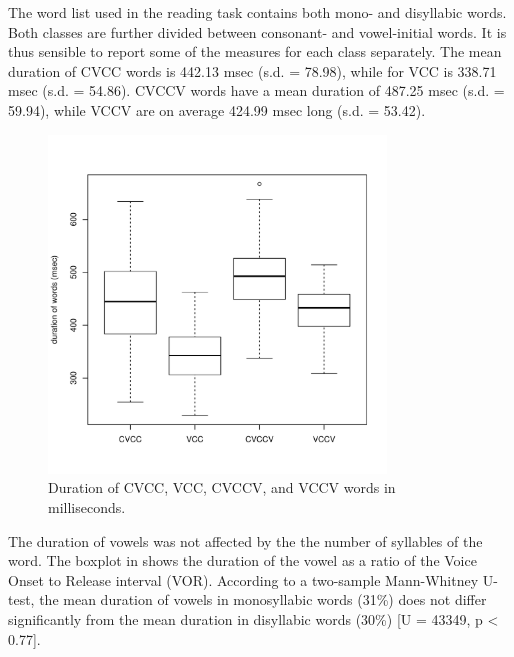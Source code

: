 \documentclass[11pt,a4paper,oneside,openany]{memoir}\usepackage[]{graphicx}\usepackage[]{color}
\newenvironment{knitrout}{}{} %
\begin{document}
The word list used in the reading task contains both mono- and disyllabic words.
Both classes are further divided between consonant- and vowel-initial words.
It is thus sensible to report some of the measures for each class separately.
The mean duration of CVCC words is 442.13 msec (s.d. = 78.98), while for VCC is 338.71 msec (s.d. = 54.86).
CVCCV words have a mean duration of 487.25 msec (s.d. = 59.94), while VCCV are on average 424.99 msec long (s.d. = 53.42).

\begin{figure}
\centering
\begin{knitrout}
\color{fgcolor}
\includegraphics[width=0.8\textwidth]{img/word-duration-1} 

\end{knitrout}
\caption{Duration of CVCC, VCC, CVCCV, and VCCV words in milliseconds.}
\label{f:worddur}
\end{figure}



The duration of vowels was not affected by the the number of syllables of the word.
The boxplot in  shows the duration of the vowel as a ratio of the Voice Onset to Release interval (VOR).
According to a two-sample Mann-Whitney U-test, the mean duration of vowels in monosyllabic words (31\%) does not differ significantly from the mean duration in disyllabic words (30\%) [U = 43349, p < 0.77].
\end{document}

